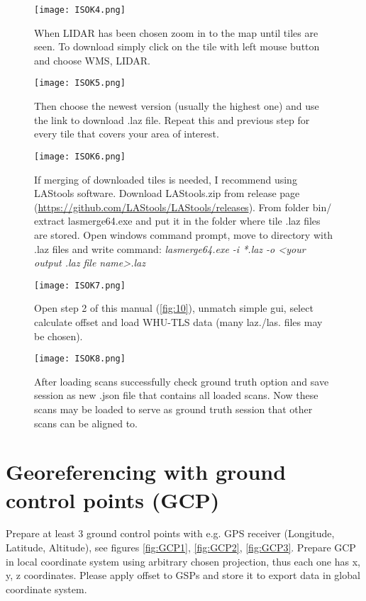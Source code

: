 \begin{figure}[H]
	\centering
	\texttt{[image: ISOK4.png]}
	\caption{When LIDAR has been chosen zoom in to the map until tiles are seen. To download simply click on the tile with left mouse button and choose WMS, LIDAR.}
	\label{fig:37}
\end{figure}

\begin{figure}[H]
	\centering
	\texttt{[image: ISOK5.png]}
	\caption{Then choose the newest version (usually the highest one) and use the link to download .laz file. Repeat this and previous step for every tile that covers your area of interest.}
	\label{fig:38}
\end{figure}

\begin{figure}[H]
	\centering
	\texttt{[image: ISOK6.png]}
	\caption{If merging of downloaded tiles is needed, I recommend using LAStools software. Download LAStools.zip from release page (\url{https://github.com/LAStools/LAStools/releases}). From folder bin/ extract lasmerge64.exe and put it in the folder where tile .laz files are stored. Open windows command prompt, move to directory with .laz files and write command: 
		\textit{lasmerge64.exe -i *.laz -o <your output .laz file name>.laz}}
	\label{fig:39}
\end{figure}

\begin{figure}[H]
	\centering
	\texttt{[image: ISOK7.png]}
	\caption{Open step 2 of this manual (\ref{fig:10}), unmatch simple gui, select calculate offset and load WHU-TLS data (many laz./las. files may be chosen).}
	\label{fig:40}
\end{figure}

\begin{figure}[H]
	\centering
	\texttt{[image: ISOK8.png]}
	\caption{After loading scans successfully check ground truth option and save session as new .json file that contains all loaded scans. Now these scans may be loaded to serve as ground truth session that other scans can be aligned to.}
	\label{fig:41}
\end{figure}

\section{Georeferencing with ground control points (GCP)}
\label{GCPs}
Prepare at least 3 ground control points with e.g. GPS receiver (Longitude, Latitude, Altitude), see figures \ref{fig:GCP1}, \ref{fig:GCP2}, \ref{fig:GCP3}.
Prepare GCP in local coordinate system using arbitrary chosen projection, thus each one has x, y, z coordinates.
Please apply offset to GSPs and store it to export data in global coordinate system.


